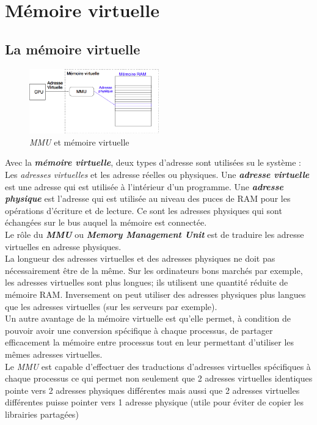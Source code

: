 \section{Mémoire virtuelle}
\subsection{La mémoire virtuelle}
\begin{figure}
  \vspace{-0.5cm}
  \includegraphics[width=0.5\textwidth]{mmu}
  \caption{\label{fig:mmu}\textit{MMU} et mémoire virtuelle}
\end{figure}
Avec la \textit{\textbf{mémoire virtuelle}}, deux types d'adresse sont utilisées su le système : Les \textit{adresses virtuelles} et les adresse réelles ou physiques. Une \textit{\textbf{adresse virtuelle}} est une adresse qui est utilisée à l'intérieur d'un programme.  Une \textit{\textbf{adresse physique}} est l'adresse qui est utilisée au niveau des puces de RAM pour les opérations d'écriture et de lecture. Ce sont les adresses physiques qui sont échangées sur le bus auquel la mémoire est connectée. \\
Le rôle du \textit{\textbf{MMU}} ou \textbf{\textit{Memory Management Unit}} est de traduire les adresse virtuelles en adresse physiques. \\

La longueur des adresses virtuelles et des adresses physiques ne doit pas nécessairement être de la même. Sur les ordinateurs bons marchés par exemple, les adresses virtuelles sont plus longues; ils utilisent une quantité réduite de mémoire RAM. Inversement on peut utiliser des adresses physiques plus langues que les adresses virtuelles (sur les serveurs par exemple).\\

Un autre avantage de la mémoire virtuelle est qu'elle permet, à condition de pouvoir avoir une conversion spécifique à  chaque processus, de partager efficacement la mémoire entre processus tout en leur permettant d'utiliser les mêmes adresses virtuelles. \\
Le \textit{MMU} est capable d'effectuer des traductions d'adresses virtuelles spécifiques à chaque processus ce qui permet non seulement que 2 adresses virtuelles identiques pointe vers 2 adresses physiques différentes mais aussi que 2 adresses virtuelles différentes puisse pointer vers 1 adresse physique (utile pour éviter de copier les librairies partagées) \\
